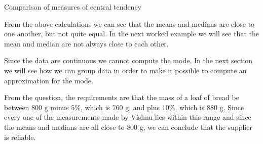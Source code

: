 \begin{wex}{Comparison of measures of central tendency}
{  From the above calculations we can see that the means and medians
  are close to one another, but not quite equal. In the next worked
  example we will see that the mean and median are not always
  close to each other.


  Since the data are continuous we cannot compute the mode. In the next
  section we will see how we can group data in order to make it possible
  to compute an approximation for the mode.


  From the question, the requirements are that the mass of a loaf of
  bread be between $800$ g minus $5$\%, which is $760$ g, and plus
  $10$\%, which is $880$ g. Since every one of the measurements made
  by Vishnu lies within this range and since the means and medians are
  all close to $800$ g, we can conclude that the supplier is reliable.

}
\end{wex}


